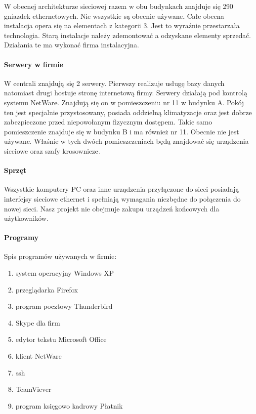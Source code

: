 \documentclass{report}
\begin{document}
W obecnej architekturze sieciowej razem w obu budynkach znajduje się 290 gniazdek ethernetowych. Nie wszystkie są obecnie używane.
Całe obecna instalacja opera się na elementach z kategorii 3. Jest to wyraźnie przestarzała technologia. Starą instalacje należy zdemontować a 
odzyskane elementy sprzedać. Działania te ma wykonać firma instalacyjna.

\paragraph{Serwery w firmie}



W centrali znajdują się 2 serwery. Pierwszy realizuje usługę
bazy danych natomiast drugi hostuje stronę internetową firmy. Serwery działają pod kontrolą systemu NetWare. Znajdują się on w
pomieszczeniu nr 11 w budynku A. Pokój ten jest specjalnie przystosowany, posiada oddzielną klimatyzacje oraz jest 
dobrze zabezpieczone przed niepowołanym fizycznym dostępem. Takie samo pomieszczenie znajduje się w budynku B i ma również nr 11. Obecnie nie jest
używane. Właśnie w tych dwóch pomieszczeniach będą znajdować się urządzenia sieciowe oraz szafy krosownicze.

\paragraph{Sprzęt}


Wszystkie komputery PC oraz inne urządzenia przyłączone do sieci posiadają interfejsy sieciowe ethernet i spełniają wymagania niezbędne
do połączenia do nowej sieci. Nasz projekt nie obejmuje zakupu urządzeń końcowych dla użytkowników.

\paragraph{Programy} Spis programów używanych w firmie:
\begin{enumerate}
 \item system operacyjny Windows XP
 \item przeglądarka Firefox
 \item program pocztowy Thunderbird
 \item Skype dla firm
 \item edytor tekstu Microsoft Office
 \item klient NetWare
 \item ssh
 \item TeamViever
 \item program księgowo kadrowy Płatnik
\end{enumerate}
\end{document}
